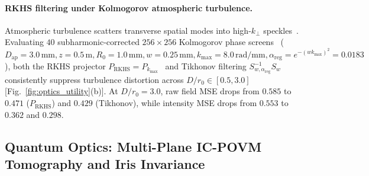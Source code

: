 \documentclass[aps,pra,reprint,amsmath,amssymb,floatfix,longbibliography]{revtex4-2}
\begin{document}
\paragraph*{RKHS filtering under Kolmogorov atmospheric turbulence.}
Atmospheric turbulence scatters transverse spatial modes into high-$k_\perp$ speckles~\cite{Paterson2005,TylerBoyd2009,AndrewsPhillips2005}. Evaluating $40$ subharmonic-corrected $256\times 256$ Kolmogorov phase screens~\cite{Lane1992} ($D_{\mathrm{ap}} = 3.0\,\mathrm{mm}, z = 0.5\,\mathrm{m}, R_0 = 1.0\,\mathrm{mm}, w = 0.25\,\mathrm{mm}, k_{\max} = 8.0\,\mathrm{rad/mm}, \alpha_{\mathrm{reg}} = e^{-(wk_{\max})^2} = 0.0183$), both the RKHS projector $P_{\mathrm{RKHS}} = P_{k_{\max}}$~\cite{PaulsenRaghupathi2016} and Tikhonov filtering $S_{w,\alpha_{\mathrm{reg}}}^{-1}S_w$ consistently suppress turbulence distortion across $D/r_0 \in [0.5,3.0]$ [Fig.~\ref{fig:optics_utility}(b)]. At $D/r_0 = 3.0$, raw field MSE drops from $0.585$ to $0.471$ ($P_{\mathrm{RKHS}}$) and $0.429$ (Tikhonov), while intensity MSE drops from $0.553$ to $0.362$ and $0.298$.

\subsection{Quantum Optics: Multi-Plane IC-POVM Tomography and Iris Invariance}
\label{subsec:quantum_utility}
\end{document}
